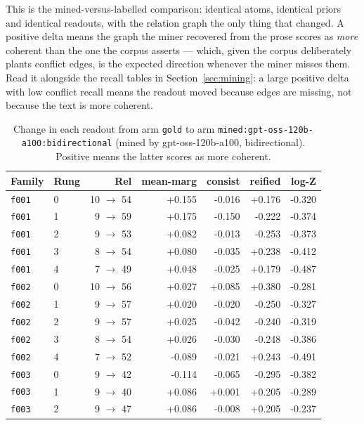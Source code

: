 \documentclass[11pt]{article}
\begin{document}
This is the mined-versus-labelled comparison: identical atoms, identical priors and identical readouts, with the relation graph the only thing that changed. A positive delta means the graph the miner recovered from the prose scores as \emph{more} coherent than the one the corpus asserts --- which, given the corpus deliberately plants conflict edges, is the expected direction whenever the miner misses them. Read it alongside the recall tables in Section~\ref{sec:mining}: a large positive delta with low conflict recall means the readout moved because edges are missing, not because the text is more coherent.

\begin{table}[htbp]
\centering
\small
\caption{Change in each readout from arm \texttt{gold} to arm \texttt{mined:gpt-oss-120b-a100:bidirectional} (mined by gpt-oss-120b-a100, bidirectional). Positive means the latter scores as more coherent.}
\label{tab:arm-delta-gold-mined-gpt-oss-120b-a100-bidirectional}
\begin{tabular}{llrrrrr}
\toprule
Family & Rung & Rel & \textbf{mean-marg} & \textbf{consist} & \textbf{reified} & \textbf{log-Z} \\
\midrule
\texttt{f001} & 0 & 10 $\to$ 54 & +0.155 & -0.016 & +0.176 & -0.320 \\
\texttt{f001} & 1 & 9 $\to$ 59 & +0.175 & -0.150 & -0.222 & -0.374 \\
\texttt{f001} & 2 & 9 $\to$ 53 & +0.082 & -0.013 & -0.253 & -0.373 \\
\texttt{f001} & 3 & 8 $\to$ 54 & +0.080 & -0.035 & +0.238 & -0.412 \\
\texttt{f001} & 4 & 7 $\to$ 49 & +0.048 & -0.025 & +0.179 & -0.487 \\
\texttt{f002} & 0 & 10 $\to$ 56 & +0.027 & +0.085 & +0.380 & -0.281 \\
\texttt{f002} & 1 & 9 $\to$ 57 & +0.020 & -0.020 & -0.250 & -0.327 \\
\texttt{f002} & 2 & 9 $\to$ 57 & +0.025 & -0.042 & -0.240 & -0.319 \\
\texttt{f002} & 3 & 8 $\to$ 54 & +0.026 & -0.030 & -0.248 & -0.386 \\
\texttt{f002} & 4 & 7 $\to$ 52 & -0.089 & -0.021 & +0.243 & -0.491 \\
\texttt{f003} & 0 & 9 $\to$ 42 & -0.114 & -0.065 & -0.295 & -0.382 \\
\texttt{f003} & 1 & 9 $\to$ 40 & +0.086 & +0.001 & +0.205 & -0.289 \\
\texttt{f003} & 2 & 9 $\to$ 47 & +0.086 & -0.008 & +0.205 & -0.237 \\

\end{tabular}
\end{table}
\end{document}
